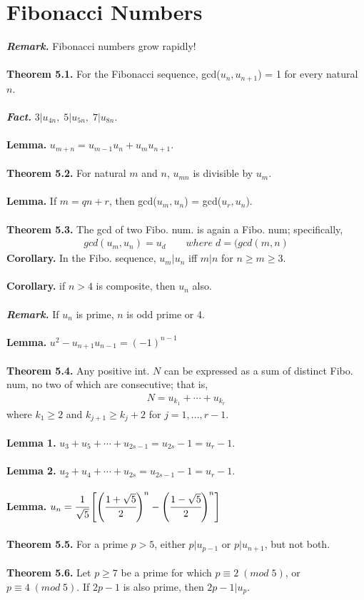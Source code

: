 \documentclass[a4paper,10pt]{article}
\begin{document}
\section{Fibonacci Numbers}
\textit{\textbf{Remark.}} Fibonacci numbers grow rapidly! \\ \\
\textbf{Theorem 5.1.} For the Fibonacci sequence, gcd($u_{n},u_{n+1}$) = 1 for every natural $n$. \\ \\
\textit{\textbf{Fact.}} \; $3|u_{4n}, \; 5|u_{5n}, \; 7|u_{8n}$. \\ \\
\textbf{Lemma.} \; $u_{m+n} = u_{m-1}u_{n}+u_{m}u_{n+1}$. \\ \\
\textbf{Theorem 5.2.} For natural $m$ and $n$, $u_{mn}$ is divisible by $u_{m}$. \\ \\
\textbf{Lemma.} If $m=qn+r$, then gcd($u_{m},u_{n}$) = gcd($u_{r},u_{n}$). \\ \\
\textbf{Theorem 5.3.} The gcd of two Fibo. num. is again a Fibo. num; specifically,
\begin{align}
gcd(u_{m},u_{n})=u_{d} \quad \quad where \; d=(gcd(m,n)
\end{align}
\textbf{Corollary.} In the Fibo. sequence, $u_{m}|u_{n}$ iff $m|n$ for $n\geq m \geq 3$. \\ \\
\textbf{Corollary.} if $n>4$ is composite, then $u_{n}$ also. \\ \\
\textit{\textbf{Remark.}} If $u_{n}$ is prime, $n$ is odd prime or 4. \\ \\
\textbf{Lemma.} \; $u^{2}-u_{n+1}u_{n-1}=(-1)^{n-1}$ \\ \\
\textbf{Theorem 5.4.} Any positive int. $N$ can be expressed as a sum of distinct Fibo. num, no two of which are consecutive; that is,
\begin{align}
N=u_{k_{1}}+\cdots+u_{k_{r}}
\end{align}
where $k_{1}\geq 2$ and $k_{j+1}\geq k_{j}+2$ for $j=1,\ldots,r-1$. \\ \\
\textbf{Lemma 1.} \; $u_{3}+u_{5}+\cdots+u_{2s-1}=u_{2s}-1=u_{r}-1$. \\ \\
\textbf{Lemma 2.} \; $u_{2}+u_{4}+\cdots+u_{2s}=u_{2s-1}-1=u_{r}-1$. \\ \\
\textbf{Lemma.} \; $u_{n}=\cfrac{1}{\sqrt{5}}\left[\left(\cfrac{1+\sqrt{5}}{2}\right)^{n}-\left(\cfrac{1-\sqrt{5}}{2}\right)^{n}\right]$ \\ \\
\textbf{Theorem 5.5.} For a prime $p>5$, either $p|u_{p-1}$ or $p|u_{n+1}$, but not both. \\ \\
\textbf{Theorem 5.6.} Let $p\geq 7$ be a prime for which $p\equiv 2 \; (mod \; 5)$, or $p\equiv 4 \; (mod \; 5)$. If $2p-1$ is also prime, then $2p-1|u_{p}$. \\ \\
\end{document}
